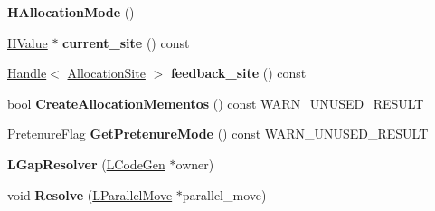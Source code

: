 \begin{DoxyCompactItemize}
\item 
{\bfseries H\+Allocation\+Mode} ()\hypertarget{classv8_1_1internal_1_1_b_a_s_e___e_m_b_e_d_d_e_d_ac57ee92f065c1b722be7b35ccaf4fe21}{}\label{classv8_1_1internal_1_1_b_a_s_e___e_m_b_e_d_d_e_d_ac57ee92f065c1b722be7b35ccaf4fe21}

\item 
\hyperlink{classv8_1_1internal_1_1_h_value}{H\+Value} $\ast$ {\bfseries current\+\_\+site} () const \hypertarget{classv8_1_1internal_1_1_b_a_s_e___e_m_b_e_d_d_e_d_ac3d49b3e8736987e051d18ac6aad0ebb}{}\label{classv8_1_1internal_1_1_b_a_s_e___e_m_b_e_d_d_e_d_ac3d49b3e8736987e051d18ac6aad0ebb}

\item 
\hyperlink{classv8_1_1internal_1_1_handle}{Handle}$<$ \hyperlink{classv8_1_1internal_1_1_allocation_site}{Allocation\+Site} $>$ {\bfseries feedback\+\_\+site} () const \hypertarget{classv8_1_1internal_1_1_b_a_s_e___e_m_b_e_d_d_e_d_aac38fbcd20aaeaae53224b42fcc335d8}{}\label{classv8_1_1internal_1_1_b_a_s_e___e_m_b_e_d_d_e_d_aac38fbcd20aaeaae53224b42fcc335d8}

\item 
bool {\bfseries Create\+Allocation\+Mementos} () const W\+A\+R\+N\+\_\+\+U\+N\+U\+S\+E\+D\+\_\+\+R\+E\+S\+U\+LT\hypertarget{classv8_1_1internal_1_1_b_a_s_e___e_m_b_e_d_d_e_d_a8d1c1c695a7ef7cf8cf0a03c98389c07}{}\label{classv8_1_1internal_1_1_b_a_s_e___e_m_b_e_d_d_e_d_a8d1c1c695a7ef7cf8cf0a03c98389c07}

\item 
Pretenure\+Flag {\bfseries Get\+Pretenure\+Mode} () const W\+A\+R\+N\+\_\+\+U\+N\+U\+S\+E\+D\+\_\+\+R\+E\+S\+U\+LT\hypertarget{classv8_1_1internal_1_1_b_a_s_e___e_m_b_e_d_d_e_d_ae98b3b49a9a7c8358fe860486f660aa6}{}\label{classv8_1_1internal_1_1_b_a_s_e___e_m_b_e_d_d_e_d_ae98b3b49a9a7c8358fe860486f660aa6}

\item 
{\bfseries L\+Gap\+Resolver} (\hyperlink{classv8_1_1internal_1_1_l_code_gen}{L\+Code\+Gen} $\ast$owner)\hypertarget{classv8_1_1internal_1_1_b_a_s_e___e_m_b_e_d_d_e_d_a0b23d339700f93d3affcf5f4f550d22b}{}\label{classv8_1_1internal_1_1_b_a_s_e___e_m_b_e_d_d_e_d_a0b23d339700f93d3affcf5f4f550d22b}

\item 
void {\bfseries Resolve} (\hyperlink{classv8_1_1internal_1_1_l_parallel_move}{L\+Parallel\+Move} $\ast$parallel\+\_\+move)\hypertarget{classv8_1_1internal_1_1_b_a_s_e___e_m_b_e_d_d_e_d_aa098bed4ffadf485fd317ccb5fe499e0}{}\label{classv8_1_1internal_1_1_b_a_s_e___e_m_b_e_d_d_e_d_aa098bed4ffadf485fd317ccb5fe499e0}


\end{DoxyCompactItemize}
